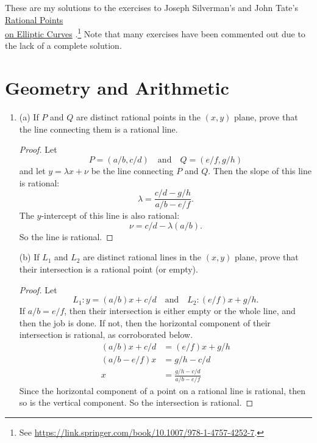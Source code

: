 \documentclass[11pt, oneside]{article}
\begin{document}
\maketitle
These are my solutions to the exercises to Joseph Silverman's and John Tate's \underline{Rational Points}\\ \underline{on Elliptic Curves} \cite{rat}.\footnote{See \url{https://link.springer.com/book/10.1007/978-1-4757-4252-7}.} Note that many exercises have been commented out due to the lack of a complete solution. 
\tableofcontents
\section{Geometry and Arithmetic}
\begin{enumerate}
\setlength{\parindent}{0pt}
\item (a) If $P$ and $Q$ are distinct rational points in the $(x,y)$ plane, prove that the line connecting them is a rational line.
\begin{proof}
Let 
$$
P = (a/b, c/d)\quad \textrm{and} \quad Q = (e/f,g/h)
$$
and let $y = \lambda x + \nu$ be the line connecting $P$ and $Q$. Then the slope of this line is rational: 
$$
\lambda = \frac{c/d - g/h}{a/b -e/f}.
$$
The $y$-intercept of this line is also rational:
$$
\nu = c/d-\lambda(a/b).
$$
So the line is rational.
\end{proof}
(b) If $L_1$ and $L_2$ are distinct rational lines in the $(x,y)$ plane, prove that their intersection is a rational point (or empty).
\begin{proof}
Let  
$$
L_1 : y = (a/b)x + c/d \quad\textrm{and}\quad L_2 : (e/f)x + g/h.
$$ 
If $a/b = e/f$, then their intersection is either empty or the whole line, and then the job is done. If not, then the horizontal component of their intersection is rational, as corroborated below.
\begin{align*}
(a/b)x + c/d &= (e/f)x + g/h\\
(a/b - e/f)x &= g/h - c/d\\
x &= \frac{g/h - c/d}{a/b - e/f}
\end{align*}
Since the horizontal component of a point on a rational line is rational, then so is the vertical component. So the intersection is rational.
\end{proof}

\end{enumerate}
\end{document}
